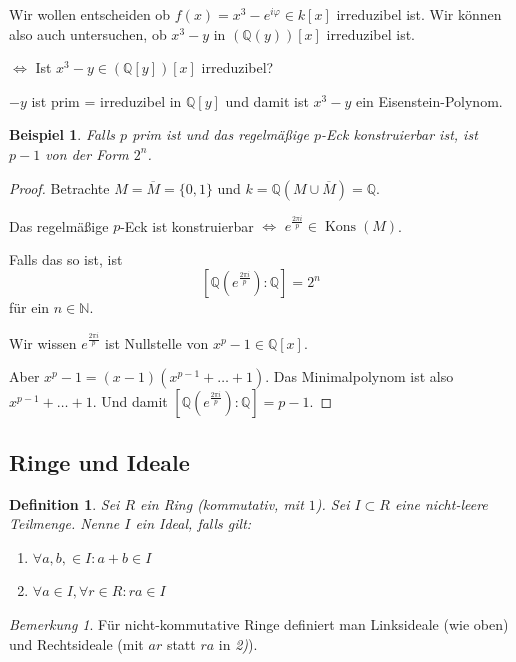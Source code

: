 \documentclass[a4paper,12pt,numbers=noenddot,parskip=full]{scrartcl}
\newcommand{\setN}{\mathbb{N}}
\newcommand{\setQ}{\mathbb{Q}}
\theoremstyle{dotless}
\newtheorem{definition}[theorem]{Definition}
\newtheorem{example}[theorem]{Beispiel}
\theoremstyle{remark}
\newtheorem*{remark}{Bemerkung}
\begin{document}
	Wir wollen entscheiden ob $f(x) = x^3 - e^{i \varphi} \in k[x]$ irreduzibel ist. Wir können also auch untersuchen, ob $x^3 - y$ in $(\setQ(y))[x]$ irreduzibel ist.
	
	$\Leftrightarrow$ Ist $x^3 - y \in (\setQ[y])[x]$ irreduzibel?
	
	$-y$ ist prim = irreduzibel in $\setQ[y]$ und damit ist $x^3 - y$ ein Eisenstein-Polynom.
	
	\begin{example}
		Falls $p$ prim ist und das regelmäßige $p$-Eck konstruierbar ist, ist $p - 1$ von der Form $2^n$.
	\end{example}

	\begin{proof}
		Betrachte $M = \overline{M} = \{ 0, 1 \}$ und $k = \setQ(M \cup \overline{M}) = \setQ$.
		
		Das regelmäßige $p$-Eck ist konstruierbar $\Leftrightarrow$ $e^{\frac{2 \pi i}{p}} \in \operatorname{Kons}(M)$.
		
		Falls das so ist, ist
		\begin{equation*}
			\left[ \setQ(e^{\frac{2 \pi i}{p}}) : \setQ \right] = 2^n
		\end{equation*}
		für ein $n \in \setN$.
		
		Wir wissen $e^{\frac{2 \pi i}{p}}$ ist Nullstelle von $x^p - 1 \in \setQ[x]$.
		
		Aber $x^p - 1 = (x-1)(x^{p-1} + \dots + 1)$. Das Minimalpolynom ist also $x^{p-1} + \dots + 1$. Und damit $\left[ \setQ(e^{\frac{2 \pi i}{p}}) : \setQ \right] = p - 1$.
	\end{proof}

	\subsection{Ringe und Ideale}
	
	\begin{definition}
		Sei $R$ ein Ring (kommutativ, mit $1$). Sei $I \subset R$ eine nicht-leere Teilmenge. Nenne $I$ ein Ideal, falls gilt:
		\begin{enumerate}
			\item $\forall a,b, \in I: a + b \in I$
			\item $\forall a \in I, \forall r \in R: r a \in I$
		\end{enumerate}
	\end{definition}

	\begin{remark}
		Für nicht-kommutative Ringe definiert man Linksideale (wie oben) und Rechtsideale (mit $ar$ statt $ra$ in \textit{2)}).
	\end{remark}
\end{document}
